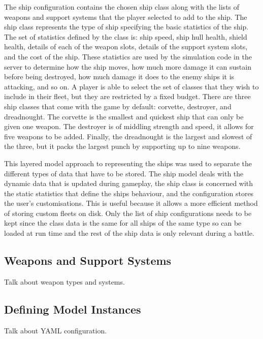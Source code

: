 The ship configuration contains the chosen ship class along with the lists of weapons and support systems that the player selected to add to the ship. The ship class represents the type of ship specifying the basic statistics of the ship. The set of statistics defined by the class is: ship speed, ship hull health, shield health, details of each of the weapon slots, details of the support system slots, and the cost of the ship. These statistics are used by the simulation code in the server to determine how the ship moves, how much more damage it can sustain before being destroyed, how much damage it does to the enemy ships it is attacking, and so on. A player is able to select the set of classes that they wish to include in their fleet, but they are restricted by a fixed budget. There are three ship classes that come with the game by default: corvette, destroyer, and dreadnought. The corvette is the smallest and quickest ship that can only be given one weapon. The destroyer is of middling strength and speed, it allows for five weapons to be added. Finally, the dreadnought is the largest and slowest of the three, but it packs the largest punch by supporting up to nine weapons.

This layered model approach to representing the ships was used to separate the different types of data that have to be stored. The ship model deals with the dynamic data that is updated during gameplay, the ship class is concerned with the static statistics that define the ships behaviour, and the configuration stores the user's customisations. This is useful because it allows a more efficient method of storing custom fleets on disk. Only the list of ship configurations needs to be kept since the class data is the same for all ships of the same type so can be loaded at run time and the rest of the ship data is only relevant during a battle.


\subsection{Weapons and Support Systems}

Talk about weapon types and systems.

\subsection{Defining Model Instances}

Talk about YAML configuration.
